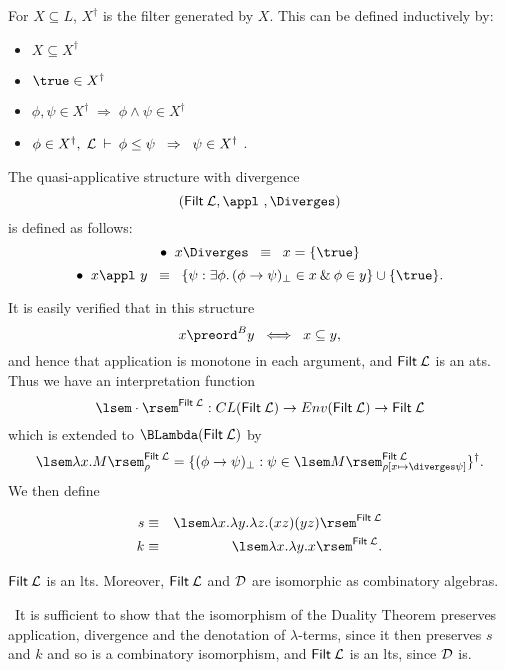  For $X \subseteq L$, $X^{\dag}$ is the filter generated by $X$. This can be defined inductively by:
\begin{itemize}
\item $X \subseteq X^{\dag}$
\item $\true \in X^{\dag}$
\item $\phi , \psi \in X^{\dag} \; \Rightarrow \; \phi \wedge \psi \in X^{\dag}$
\item $\phi \in X^{\dag}, \; {\cal L} \: \vdash \: \phi \leq \psi \;\; \Rightarrow \;\; \psi \in X^{\dag}$ .
\end{itemize}
\begin{definition}
{\rm The quasi-applicative structure with divergence 
\[ ({\sf Filt} \: {\cal L}, \appl\ , \Diverges ) \]
is defined as follows:
\[ \bullet \;\; x \Diverges \;\; \equiv \;\; x = \{ \true \} \]
\[ \bullet \;\; x \appl\  y \;\; \equiv \;\; \{ \psi : \exists \phi . \, (\phi \rightarrow \psi )_{\bot} \in x \: \& \: \phi \in y \} \cup \{ \true \} . 
\]}
\end{definition}
It is easily verified that in this structure
\[ x \preord^{B} y \;\; \Longleftrightarrow \;\; x \subseteq y , \]
and hence that application is monotone in each argument, and ${\sf Filt} \: {\cal L}$ is an ats. Thus we have an interpretation function
\[ \lsem \cdot \rsem^{{\sf Filt} \: {\cal L}} : CL({\sf Filt} \: {\cal L}) \rightarrow Env({\sf Filt} \: {\cal L}) \rightarrow {\sf Filt} \: {\cal L} \]
which is extended to $\BLambda({\sf Filt} \: {\cal L})$ by
\[ \lsem \lambda x . M \rsem^{{\sf Filt} \: {\cal L}}_{\rho} = \{ (\phi \rightarrow \psi )_{\bot} : \psi \in \lsem M \rsem^{{\sf Filt} \: {\cal L}}_{\rho [ x \mapsto \diverges \psi ]} \}^{\dag} . \]
We then define
\begin{definition}
\begin{eqnarray*}
s & \equiv & \lsem \lambda x . \lambda y . \lambda z . (xz) (yz) \rsem^{{\sf Filt} \: {\cal L}} \\
k & \equiv & \lsem \lambda x . \lambda y . x \rsem^{{\sf Filt} \: {\cal L}} . 
\end{eqnarray*}
\end{definition}
\begin{proposition}
\label{isocalg}
${\sf Filt} \: {\cal L}$ is an lts. Moreover, ${\sf Filt} \: {\cal L}$ and $\cal D$ are isomorphic as combinatory algebras.
\end{proposition}

\proof\ It is sufficient to show that the isomorphism of the Duality Theorem 
preserves application, divergence and the denotation of $\lambda$-terms, 
since it then preserves $s$ and $k$ and so is a combinatory isomorphism, and 
${\sf Filt} \: {\cal L}$ is an lts, since $\cal D$ is.

